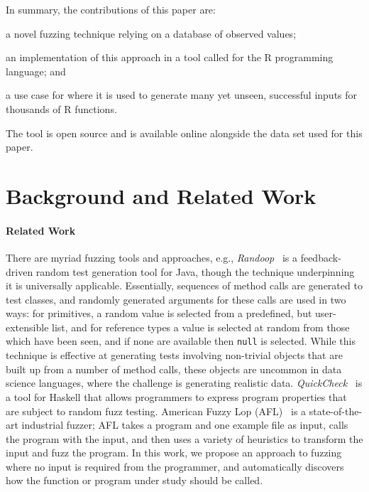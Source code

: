 \documentclass[sigplan,anonymous,review]{acmart}
\begin{document}
In summary, the contributions of this paper are:
%
\begin{inparaenum}[(1)]
    \item a novel fuzzing technique relying on a database of observed values;
    \item an implementation of this approach in a tool called \tool for the R programming language; and
    \item a use case for \tool where it is used to generate many yet unseen, successful inputs for thousands of R functions.
\end{inparaenum} 

The tool is open source and is available online alongside the data set used for this paper.

\section{Background and Related Work}
\label{sec:background}

\paragraph{Related Work}

There are myriad fuzzing tools and approaches, e.g., \emph{Randoop}~\cite{pacheco2007randoop} is a feedback-driven random test generation tool for Java, though the technique underpinning it is universally applicable.
Essentially, sequences of method calls are generated to test classes, and randomly generated arguments for these calls are used in two ways: for primitives, a random value is selected from a predefined, but user-extensible list, and for reference types a value is selected at random from those which have been seen, and if none are available then {\tt null} is selected.
While this technique is effective at generating tests involving non-trivial objects that are built up from a number of method calls, these objects are uncommon in data science languages, where the challenge is generating realistic data.
\emph{QuickCheck}~\cite{quickcheck} is a tool for Haskell that allows programmers to express program properties that are subject to random fuzz testing.
American Fuzzy Lop (AFL)~\cite{afl} is a state-of-the-art industrial fuzzer; AFL takes a program and one example file as input, calls the program with the input, and then uses a variety of heuristics to transform the input and fuzz the program.
 In this work, we propose an approach to fuzzing where no input is required from the programmer, and automatically discovers how the function or program under study should be called.
\end{document}

